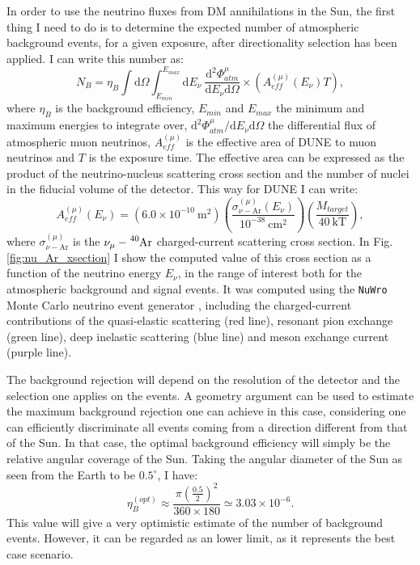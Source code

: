 In order to use the neutrino fluxes from DM annihilations in the Sun, the first thing I need to do is to determine the expected number of atmospheric background events, for a given exposure, after directionality selection has been applied. I can write this number as:
\begin{equation}\label{4.1}
	N_{B} = \eta_{B} \int \mathrm{d}\Omega \int_{E_{min}}^{E_{max}} \mathrm{d}E_{\nu} \ \frac{\mathrm{d}^{2}\Phi_{atm}^{\mu}}{\mathrm{d}E_{\nu} \mathrm{d}\Omega} \times \left(A_{eff}^{(\mu)}(E_{\nu}) T\right),
\end{equation}
where $\eta_{B}$ is the background efficiency, $E_{min}$ and $E_{max}$ the minimum and maximum energies to integrate over, $\mathrm{d}^{2}\Phi_{atm}^{\mu} / \mathrm{d}E_{\nu} \mathrm{d}\Omega$ the differential flux of atmospheric muon neutrinos, $A_{eff}^{(\mu)}$ is the effective area of DUNE to muon neutrinos and $T$ is the exposure time. The effective area can be expressed as the product of the neutrino-nucleus scattering cross section and the number of nuclei in the fiducial volume of the detector. This way for DUNE I can write:
\begin{equation}\label{4.2}
	A_{eff}^{(\mu)}(E_{\nu}) = (6.0 \times 10^{-10} \ \mathrm{m}^{2}) \left(\frac{\sigma_{\nu - \mathrm{Ar}}^{(\mu)}(E_{\nu})}{10^{-38} \ \mathrm{cm}^{2}}\right) \left(\frac{M_{target}}{40 \ \mathrm{kT}}\right),
\end{equation}
where $\sigma_{\nu - \mathrm{Ar}}^{(\mu)}$ is the $\nu_{\mu}-\ce{^{40}Ar}$ charged-current scattering cross section. In Fig. \ref{fig:nu_Ar_xsection} I show the computed value of this cross section as a function of the neutrino energy $E_{\nu}$, in the range of interest both for the atmospheric background and signal events. It was computed using the \texttt{NuWro} Monte Carlo neutrino event generator \cite{Golan2012}, including the charged-current contributions of the quasi-elastic scattering (red line), resonant pion exchange (green line), deep inelastic scattering (blue line) and meson exchange current (purple line).

The background rejection will depend on the resolution of the detector and the selection one applies on the events. A geometry argument can be used to estimate the maximum background rejection one can achieve in this case, considering one can efficiently discriminate all events coming from a direction different from that of the Sun. In that case, the optimal background efficiency will simply be the relative angular coverage of the Sun. Taking the angular diameter of the Sun as seen from the Earth to be $0.5^{\circ}$, I have:
\begin{equation}\label{4.3}
	\eta_{B}^{(opt)} \approx \frac{\pi \left(\frac{0.5}{2}\right)^{2}}{360 \times 180} \simeq 3.03 \times 10^{-6}.
\end{equation}
This value will give a very optimistic estimate of the number of background events. However, it can be regarded as an lower limit, as it represents the best case scenario.

